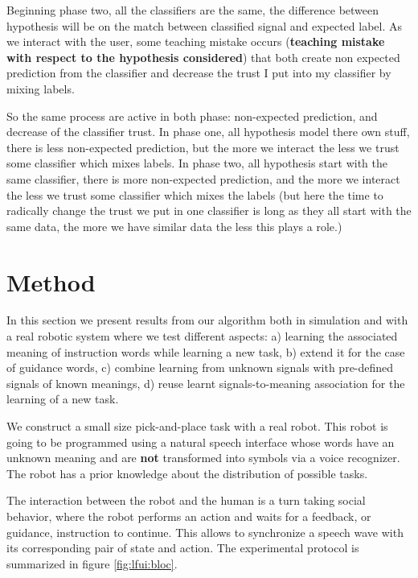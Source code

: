 Beginning phase two, all the classifiers are the same, the difference between hypothesis will be on the match between classified signal and expected label. As we interact with the user, some teaching mistake occurs (\textbf{teaching mistake with respect to the hypothesis considered}) that both create non expected prediction from the classifier and decrease the trust I put into my classifier by mixing labels.

So the same process are active in both phase: non-expected prediction, and decrease of the classifier trust.
In phase one, all hypothesis model there own stuff, there is less non-expected prediction, but the more we interact the less we trust some classifier which mixes labels.
In phase two, all hypothesis start with the same classifier, there is more non-expected prediction, and the more we interact the less we trust some classifier which mixes the labels (but here the time to radically change the trust we put in one classifier is long as they all start with the same data, the more we have similar data the less this plays a role.)

\section{Method}

In this section we present results from our algorithm both in simulation and with a real robotic system where we test different aspects: a) learning the associated meaning of instruction words while learning a new task, b) extend it for the case of guidance words, c) combine learning from unknown signals with pre-defined signals of known meanings, d) reuse learnt signals-to-meaning association for the learning of a new task.

We construct a small size pick-and-place task with a real robot. This robot is going to be programmed using a natural speech interface whose words have an unknown meaning and are \textbf{not} transformed into symbols via a voice recognizer. The robot has a prior knowledge about the distribution of possible tasks.

The interaction between the robot and the human is a turn taking social behavior, where the robot performs an action and waits for a feedback, or guidance, instruction to continue. This allows to synchronize a speech wave with its corresponding pair of state and action. The experimental protocol is summarized in figure \ref{fig:lfui:bloc}.

